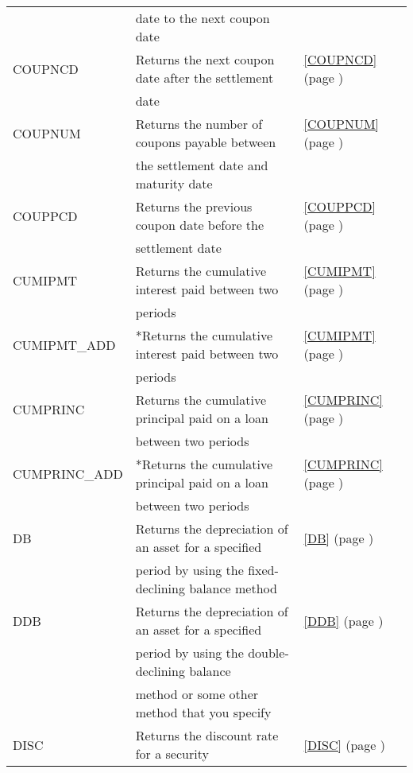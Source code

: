 \begin{center}
\begin{longtable}{l l l }
		& date to the next coupon date &  \\
		COUPNCD & Returns the next coupon date after the settlement  &  \ref{COUPNCD} (page \pageref{COUPNCD}) \index{Spreadsheet Functions!COUPNCD} \\
		& date  &   \\		
		COUPNUM & Returns the number of coupons payable between &  \ref{COUPNUM} (page \pageref{COUPNUM}) \index{Spreadsheet Functions!COUPNUM} \\
		& the settlement date and maturity date &   \\
		COUPPCD & Returns the previous coupon date before the  &  \ref{COUPPCD} (page \pageref{COUPPCD}) \index{Spreadsheet Functions!COUPPCD} \\
		& settlement date  &   \\
		CUMIPMT & Returns the cumulative interest paid between two  &  \ref{CUMIPMT} (page \pageref{CUMIPMT}) \index{Spreadsheet Functions!CUMIPMT} \\
		& periods  &   \\
		CUMIPMT\_ADD & *Returns the cumulative interest paid between two  &  \ref{CUMIPMT} (page \pageref{CUMIPMT}) \index{Spreadsheet Functions!CUMIPMT\_ADD} \\
		& periods  &   \\
		CUMPRINC & Returns the cumulative principal paid on a loan  &  \ref{CUMPRINC} (page \pageref{CUMPRINC}) \index{Spreadsheet Functions!CUMPRINC} \\
		& between two periods &   \\
		CUMPRINC\_ADD & *Returns the cumulative principal paid on a loan  &  \ref{CUMPRINC} (page \pageref{CUMPRINC}) \index{Spreadsheet Functions!CUMPRINC\_ADD} \\
		& between two periods &   \\
		DB    & Returns the depreciation of an asset for a specified &  \ref{DB} (page \pageref{DB}) \index{Spreadsheet Functions!DB} \\
		& period by using the fixed-declining balance method &   \\
		DDB   & Returns the depreciation of an asset for a specified &  \ref{DDB} (page \pageref{DDB}) \index{Spreadsheet Functions!DDB} \\
		& period by using the double-declining balance &   \\
		& method or some other method that you specify &   \\
		DISC  & Returns the discount rate for a security &  \ref{DISC} (page \pageref{DISC}) \index{Spreadsheet Functions!DISC} \\

\end{longtable}
\end{center}
